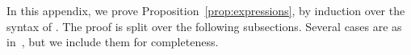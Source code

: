 


In this appendix, we prove Proposition~\ref{prop:expressions}, by induction
over the syntax of \CSPm.  The proof is split over the following subsections.
Several cases are as in~\cite{symmetry-TR}, but we include them for
completeness.

